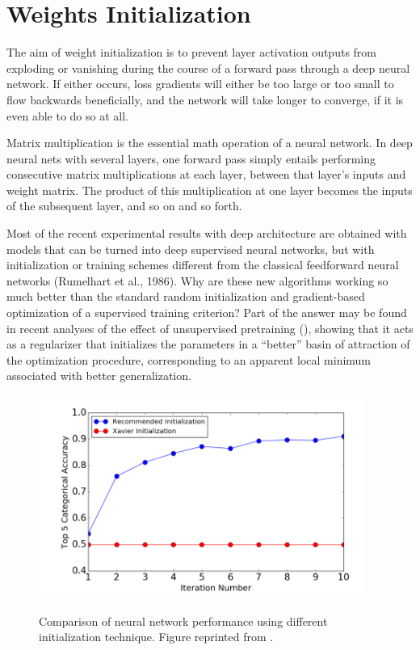 \section{Weights Initialization}
\label{sec:weight_init}
The aim of weight initialization is to prevent layer activation outputs from exploding or vanishing during the course of a forward pass through a deep neural network. If either occurs, loss gradients will either be too large or too small to flow backwards beneficially, and the network will take longer to converge, if it is even able to do so at all.

Matrix multiplication is the essential math operation of a neural network. In deep neural nets with several layers, one forward pass simply entails performing consecutive matrix multiplications at each layer, between that layer's inputs and weight matrix. The product of this multiplication at one layer becomes the inputs of the subsequent layer, and so on and so forth.

Most of the recent experimental results with deep architecture are obtained with models that can be turned into deep supervised neural networks, but with initialization or training schemes different from the classical feedforward neural networks (Rumelhart et al., 1986). Why are these new algorithms working so much better than the standard random initialization and gradient-based optimization of a supervised training criterion? Part of the answer may be found in recent analyses of the effect of unsupervised pretraining (\cite{erhan2009thedifficulty}), showing that it acts as a regularizer that initializes the parameters in a “better” basin of attraction of the optimization procedure, corresponding to an apparent local minimum associated with better generalization.

\begin{figure}[h]
    {\includegraphics[width=0.95\textwidth]{img/comp_init.png}}
    \centering
    \caption{Comparison of neural network performance using different initialization technique. Figure reprinted from \cite{kumar2017onweight}.}
    \label{img:comp_init}
\end{figure}

